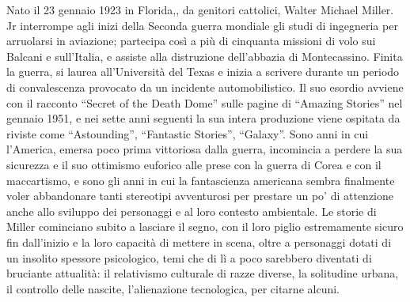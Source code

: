 Nato il 23 gennaio 1923 in Florida,, da genitori cattolici, Walter Michael Miller. Jr interrompe agli inizi della Seconda guerra mondiale gli studi di ingegneria per arruolarsi in aviazione; partecipa così a più di cinquanta missioni di volo sui Balcani e sull'Italia, e assiste alla distruzione dell'abbazia di Montecassino. Finita la guerra, si laurea all'Università del Texas e inizia a scrivere durante un periodo di convalescenza provocato da un incidente automobilistico. Il suo esordio avviene con il racconto “Secret of the Death Dome” sulle pagine di “Amazing Stories” nel gennaio 1951, e nei sette anni seguenti la sua intera produzione viene ospitata da riviste come “Astounding”, “Fantastic Stories”, “Galaxy”. Sono anni in cui l'America, emersa poco prima vittoriosa dalla guerra, incomincia a perdere la sua sicurezza e il suo ottimismo euforico alle prese con la guerra di Corea e con il maccartismo, e sono gli anni in cui la fantascienza americana sembra finalmente voler abbandonare tanti stereotipi avventurosi per prestare un po' di attenzione anche allo sviluppo dei personaggi e al loro contesto ambientale. Le storie di Miller cominciano subito a lasciare il segno, con il loro piglio estremamente sicuro fin dall'inizio e la loro capacità di mettere in scena, oltre a personaggi dotati di un insolito spessore psicologico, temi che di lì a poco sarebbero diventati di bruciante attualità: il relativismo culturale di razze diverse, la solitudine urbana, il controllo delle nascite, l'alienazione tecnologica, per citarne alcuni.
